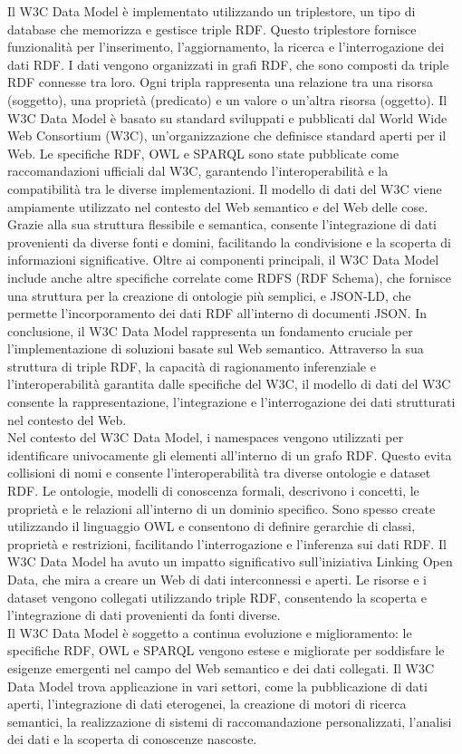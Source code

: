 Il W3C Data Model è implementato utilizzando un triplestore, un tipo di database che memorizza e gestisce triple RDF. Questo triplestore fornisce funzionalità per l'inserimento, l'aggiornamento, la ricerca e l'interrogazione dei dati RDF. I dati vengono organizzati in grafi RDF, che sono composti da triple RDF connesse tra loro. Ogni tripla rappresenta una relazione tra una risorsa (soggetto), una proprietà (predicato) e un valore o un'altra risorsa (oggetto).
Il W3C Data Model è basato su standard sviluppati e pubblicati dal World Wide Web Consortium (W3C), un'organizzazione che definisce standard aperti per il Web. Le specifiche RDF, OWL e SPARQL sono state pubblicate come raccomandazioni ufficiali dal W3C, garantendo l'interoperabilità e la compatibilità tra le diverse implementazioni.
Il modello di dati del W3C viene ampiamente utilizzato nel contesto del Web semantico e del Web delle cose. Grazie alla sua struttura flessibile e semantica, consente l'integrazione di dati provenienti da diverse fonti e domini, facilitando la condivisione e la scoperta di informazioni significative.
Oltre ai componenti principali, il W3C Data Model include anche altre specifiche correlate come RDFS (RDF Schema), che fornisce una struttura per la creazione di ontologie più semplici, e JSON-LD, che permette l'incorporamento dei dati RDF all'interno di documenti JSON.
In conclusione, il W3C Data Model rappresenta un fondamento cruciale per l'implementazione di soluzioni basate sul Web semantico. Attraverso la sua struttura di triple RDF, la capacità di ragionamento inferenziale e l'interoperabilità garantita dalle specifiche del W3C, il modello di dati del W3C consente la rappresentazione, l'integrazione e l'interrogazione dei dati strutturati nel contesto del Web.\\

Nel contesto del W3C Data Model, i namespaces vengono utilizzati per identificare univocamente gli elementi all'interno di un grafo RDF. Questo evita collisioni di nomi e consente l'interoperabilità tra diverse ontologie e dataset RDF. Le ontologie, modelli di conoscenza formali, descrivono i concetti, le proprietà e le relazioni all'interno di un dominio specifico. Sono spesso create utilizzando il linguaggio OWL e consentono di definire gerarchie di classi, proprietà e restrizioni, facilitando l'interrogazione e l'inferenza sui dati RDF.
Il W3C Data Model ha avuto un impatto significativo sull'iniziativa Linking Open Data, che mira a creare un Web di dati interconnessi e aperti. Le risorse e i dataset vengono collegati utilizzando triple RDF, consentendo la scoperta e l'integrazione di dati provenienti da fonti diverse.\\
Il W3C Data Model è soggetto a continua evoluzione e miglioramento: le specifiche RDF, OWL e SPARQL vengono estese e migliorate per soddisfare le esigenze emergenti nel campo del Web semantico e dei dati collegati.
Il W3C Data Model trova applicazione in vari settori, come la pubblicazione di dati aperti, l'integrazione di dati eterogenei, la creazione di motori di ricerca semantici, la realizzazione di sistemi di raccomandazione personalizzati, l'analisi dei dati e la scoperta di conoscenze nascoste.\\

